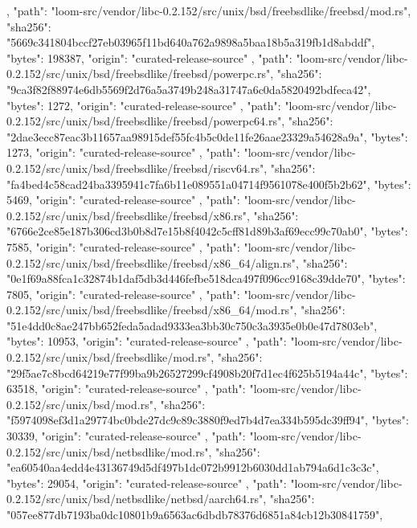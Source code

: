 {{    },
    {
      "path": "loom-src/vendor/libc-0.2.152/src/unix/bsd/freebsdlike/freebsd/mod.rs",
      "sha256": "5669c341804bccf27eb03965f11bd640a762a9898a5baa18b5a319fb1d8abddf",
      "bytes": 198387,
      "origin": "curated-release-source"
    },
    {
      "path": "loom-src/vendor/libc-0.2.152/src/unix/bsd/freebsdlike/freebsd/powerpc.rs",
      "sha256": "9ca3f82f88974e6db5569f2d76a5a3749b248a31747a6c0da5820492bdfeca42",
      "bytes": 1272,
      "origin": "curated-release-source"
    },
    {
      "path": "loom-src/vendor/libc-0.2.152/src/unix/bsd/freebsdlike/freebsd/powerpc64.rs",
      "sha256": "2dae3ecc87eac3b11657aa98915def55fc4b5c0de11fe26aae23329a54628a9a",
      "bytes": 1273,
      "origin": "curated-release-source"
    },
    {
      "path": "loom-src/vendor/libc-0.2.152/src/unix/bsd/freebsdlike/freebsd/riscv64.rs",
      "sha256": "fa4bed4c58cad24ba3395941c7fa6b11e089551a04714f9561078e400f5b2b62",
      "bytes": 5469,
      "origin": "curated-release-source"
    },
    {
      "path": "loom-src/vendor/libc-0.2.152/src/unix/bsd/freebsdlike/freebsd/x86.rs",
      "sha256": "6766e2ce85e187b306cd3b0b8d7e15b8f4042c5cff81d89b3af69ecc99c70ab0",
      "bytes": 7585,
      "origin": "curated-release-source"
    },
    {
      "path": "loom-src/vendor/libc-0.2.152/src/unix/bsd/freebsdlike/freebsd/x86_64/align.rs",
      "sha256": "0e1f69a88fca1c32874b1daf5db3d446fefbe518dca497f096cc9168c39dde70",
      "bytes": 7805,
      "origin": "curated-release-source"
    },
    {
      "path": "loom-src/vendor/libc-0.2.152/src/unix/bsd/freebsdlike/freebsd/x86_64/mod.rs",
      "sha256": "51e4dd0c8ae247bb652feda5adad9333ea3bb30c750c3a3935e0b0e47d7803eb",
      "bytes": 10953,
      "origin": "curated-release-source"
    },
    {
      "path": "loom-src/vendor/libc-0.2.152/src/unix/bsd/freebsdlike/mod.rs",
      "sha256": "29f5ae7c8bcd64219e77f99ba9b26527299cf4908b20f7d1ec4f625b5194a44c",
      "bytes": 63518,
      "origin": "curated-release-source"
    },
    {
      "path": "loom-src/vendor/libc-0.2.152/src/unix/bsd/mod.rs",
      "sha256": "f5974098ef3d1a29774bc0bde27dc9c89c3880f9ed7b4d7ea334b595dc39ff94",
      "bytes": 30339,
      "origin": "curated-release-source"
    },
    {
      "path": "loom-src/vendor/libc-0.2.152/src/unix/bsd/netbsdlike/mod.rs",
      "sha256": "ea60540aa4edd4e43136749d5df497b1dc072b9912b6030dd1ab794a6d1c3c3c",
      "bytes": 29054,
      "origin": "curated-release-source"
    },
    {
      "path": "loom-src/vendor/libc-0.2.152/src/unix/bsd/netbsdlike/netbsd/aarch64.rs",
      "sha256": "057ee877db7193ba0dc10801b9a6563ac6dbdb78376d6851a84cb12b30841759",
}}
